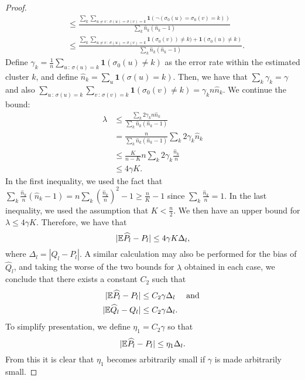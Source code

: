 \documentclass{article}
\begin{document}
\begin{proof}
\begin{align*}
  &\leq \frac{\sum_k \sum_{u \neq v \,:\, \sigma(u)=\sigma(v)=k} 
       \mathbf{1}( \neg (\sigma_0(u) = \sigma_0(v) =k) )}{\sum_k \hat{n}_k (\hat{n}_k-1)} 
      \\ 
  &\leq \frac{ \sum_k \sum_{u \neq v \,:\, \sigma(u)=\sigma(v)=k} \mathbf{1}(\sigma_0(v)) \neq k) + \mathbf{1}(\sigma_0(u) \neq k)}
            {\sum_k \hat{n}_k (\hat{n}_k - 1)}.
\end{align*}
Define $\gamma_k = \frac{1}{n} \sum_{u \,:\, \sigma(u)=k} \mathbf{1}(\sigma_0(u) \neq k)$ as the error rate within the estimated cluster $k$, and define $\hat{n}_k = \sum_u \mathbf{1}(\sigma(u) = k)$. Then, we have that $\sum_k \gamma_k = \gamma$ and also $\sum_{u \,:\, \sigma(u) = k} \sum_{v \,:\, \sigma(v) = k} \mathbf{1}(\sigma_0(v) \neq k) = \gamma_k n \hat{n}_k$. We continue the bound: 
\begin{align*}
\lambda  
  &\leq \frac{ \sum_k 2 \gamma_k n \hat{n}_k }{\sum_k \hat{n}_k(\hat{n}_k - 1)} 
     \\
  &= \frac{n}{\sum_k \hat{n}_k (\hat{n}_k - 1) } \sum_k 2 \gamma_k \hat{n}_k 
     \\
  &\leq \frac{K}{n-K} n \sum_k 2 \gamma_k \frac{\hat{n}_k}{n} \\
  &\leq 4 \gamma K.
\end{align*}
In the first inequality, we used the fact that $\sum_k \frac{\hat{n}_k }{n} (\hat{n}_k - 1) = n \sum_k \left( \frac{\hat{n}_k}{n} \right)^2 - 1 \geq \frac{n}{K} - 1$ since $\sum_k \frac{\hat{n}_k}{n} = 1$. In the last inequality, we used the assumption that $K < \frac{n}{2}$. 
We then have an upper bound for $\lambda \leq 4 \gamma K$. Therefore, we have that
\[
|{\mathbb E} \widehat{P}_l - P_l | \leq 4 \gamma K \Delta_l,
\]
where $\Delta_l  = |Q_l - P_l|$. A similar calculation may also be performed for the bias of $\hat Q_l$, and taking the worse of the two bounds for $\lambda$ obtained in each case, we conclude that there exists a constant $C_2$ such that 
\begin{align*}
|{\mathbb E} \widehat{P}_l - P_l | &\leq C_2 \gamma \Delta_l \quad \text{ and }\\
|{\mathbb E} \widehat{Q}_l - Q_l | &\leq C_2 \gamma \Delta_l.
\end{align*}
To simplify presentation, we define $\eta_1 = C_2 \gamma$ so that
\begin{equation} \label{eq: A1.5}
|{\mathbb E} \widehat{P}_l - P_l | \leq \eta_1 \Delta_l.
\end{equation}
From this it is clear that $\eta_1$ becomes arbitrarily small if $\gamma$ is made arbitrarily small. 


\end{proof}
\end{document}
